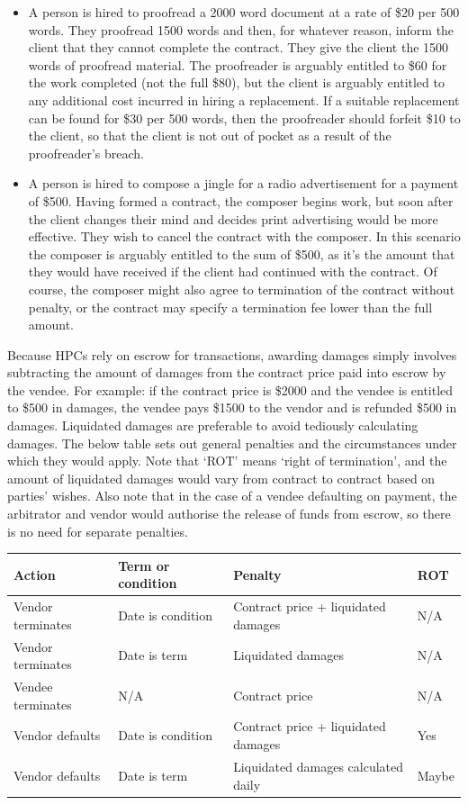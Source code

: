 \documentclass[a4paper,12pt]{article}
\begin{document}
\begin{itemize}
	\item A person is hired to proofread a 2000 word document at a rate of \$20 per 500 words. They proofread 1500 words and then, for whatever reason, inform the client that they cannot complete the contract. They give the client the 1500 words of proofread material. The proofreader is arguably entitled to \$60 for the work completed (not the full \$80), but the client is arguably entitled to any additional cost incurred in hiring a replacement. If a suitable replacement can be found for \$30 per 500 words, then the proofreader should forfeit \$10 to the client, so that the client is not out of pocket as a result of the proofreader's breach.
	\item A person is hired to compose a jingle for a radio advertisement for a payment of \$500. Having formed a contract, the composer begins work, but soon after the client changes their mind and decides print advertising would be more effective. They wish to cancel the contract with the composer. In this scenario the composer is arguably entitled to the sum of \$500, as it's the amount that they would have received if the client had continued with the contract. Of course, the composer might also agree to termination of the contract without penalty, or the contract may specify a termination fee lower than the full amount.
\end{itemize}

Because HPCs rely on escrow for transactions, awarding damages simply involves subtracting the amount of damages from the contract price paid into escrow by the vendee. For example: if the contract price is \$2000 and the vendee is entitled to \$500 in damages, the vendee pays \$1500 to the vendor and is refunded \$500 in damages. Liquidated damages are preferable to avoid tediously calculating damages. The below table sets out general penalties and the circumstances under which they would apply. Note that `ROT' means `right of termination', and the amount of liquidated damages would vary from contract to contract based on parties' wishes. Also note that in the case of a vendee defaulting on payment, the arbitrator and vendor would authorise the release of funds from escrow, so there is no need for separate penalties.

\begin{tabularx}{\textwidth}{| l | l | X | l |}
\hline
Action 						& Term or condition & Penalty															& ROT   \\
\hline
Vendor terminates & Date is condition & Contract price + liquidated damages & N/A 	\\
Vendor terminates & Date is term			& Liquidated damages									& N/A 	\\
Vendee terminates & N/A 							& Contract price											& N/A 	\\
Vendor defaults		& Date is condition & Contract price + liquidated damages & Yes 	\\
Vendor defaults   & Date is term			& Liquidated damages calculated daily & Maybe \\
\hline
\end{tabularx}
\end{document}
